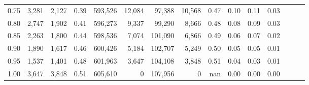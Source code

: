 \begin{tabular}{rrrrrrrrrrrrrrr}
0.75 &   3,281 &   2,127 &  0.39 &  593,526 &   12,084 &   97,388 &   10,568 &  0.47 &  0.10 &  0.11 &      0.03 \\
0.80 &   2,747 &   1,902 &  0.41 &  596,273 &    9,337 &   99,290 &    8,666 &  0.48 &  0.08 &  0.09 &      0.03 \\
0.85 &   2,263 &   1,800 &  0.44 &  598,536 &    7,074 &  101,090 &    6,866 &  0.49 &  0.06 &  0.07 &      0.02 \\
0.90 &   1,890 &   1,617 &  0.46 &  600,426 &    5,184 &  102,707 &    5,249 &  0.50 &  0.05 &  0.05 &      0.01 \\
0.95 &   1,537 &   1,401 &  0.48 &  601,963 &    3,647 &  104,108 &    3,848 &  0.51 &  0.04 &  0.03 &      0.01 \\
1.00 &   3,647 &   3,848 &  0.51 &  605,610 &        0 &  107,956 &        0 &   nan &  0.00 &  0.00 &      0.00 \\
\bottomrule
\end{tabular}
